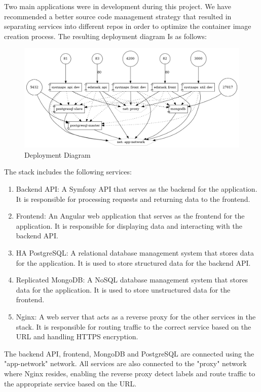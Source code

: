Two main applications were in development during this project. We have recommended a better source code management strategy that resulted in separating services into different repos in order to optimize the container image creation process. The resulting deployment diagram Is as follows: 

 \begin{figure}[H]\centering
\includegraphics[width=1.0\textwidth,angle=00]{assets/f10.png}
\caption{ Deployment Diagram }
\label{fig:DeploymentDiagram}
\end{figure}

The stack includes the following services: 
\begin{enumerate}
\item Backend API: A Symfony\cite{Symfony} API that serves as the backend for the application. It is responsible for processing requests and returning data to the frontend. 
\item Frontend: An Angular\cite{Angular} web application that serves as the frontend for the application. It is responsible for displaying data and interacting with the backend API. 
\item HA PostgreSQL\cite{PostgreSQL}: A relational database management system that stores data for the application. It is used to store structured data for the backend API. 
\item Replicated MongoDB\cite{MongoDB}: A NoSQL database management system that stores data for the application. It is used to store unstructured data for the frontend. 
\item Nginx\cite{Nginx}: A web server that acts as a reverse proxy for the other services in the stack. It is responsible for routing traffic to the correct service based on the URL and handling HTTPS encryption. 
\end{enumerate}

The backend API, frontend, MongoDB and PostgreSQL are connected using the "app-network" network. All services are also connected to the "proxy" network where Nginx resides, enabling the reverse proxy detect labels and route traffic to the appropriate service based on the URL.

